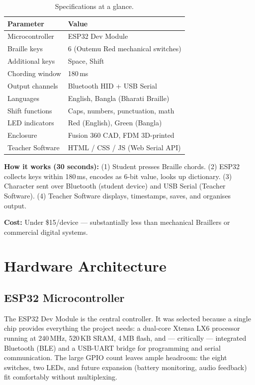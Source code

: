 \documentclass[11pt,a4paper,twoside]{article}
\begin{document}
\begin{table}[H]\centering
\caption{Specifications at a glance.}\label{tab:specs}
\begin{tabular}{l l}\toprule
\bfseries Parameter & \bfseries Value \\\midrule
Microcontroller & ESP32 Dev Module \\
Braille keys & 6 (Outemu Red mechanical switches) \\
Additional keys & Space, Shift \\
Chording window & 180\,ms \\
Output channels & Bluetooth HID + USB Serial \\
Languages & English, Bangla (Bharati Braille) \\
Shift functions & Caps, numbers, punctuation, math \\
LED indicators & Red (English), Green (Bangla) \\
Enclosure & Fusion 360 CAD, FDM 3D-printed \\
Teacher Software & HTML / CSS / JS (Web Serial API) \\
\bottomrule\end{tabular}\end{table}

\noindent\textbf{How it works (30 seconds):}
(1) Student presses Braille chords. (2) ESP32 collects keys within 180\,ms,
encodes as 6-bit value, looks up dictionary. (3) Character sent over
Bluetooth (student device) and USB Serial (Teacher Software).
(4) Teacher Software displays, timestamps, saves, and organises output.

\textbf{Cost:} Under \$15/device --- substantially less than mechanical
Braillers or commercial digital systems.

\section{Hardware Architecture}

\subsection{ESP32 Microcontroller}
The ESP32 Dev Module is the central controller. It was selected because a
single chip provides everything the project needs: a dual-core Xtensa
LX6 processor running at 240\,MHz, 520\,KB SRAM, 4\,MB flash, and ---
critically --- integrated Bluetooth (BLE) and a USB-UART bridge for
programming and serial communication. The large GPIO count leaves ample
headroom: the eight switches, two LEDs, and future expansion (battery
monitoring, audio feedback) fit comfortably without multiplexing.
\end{document}
